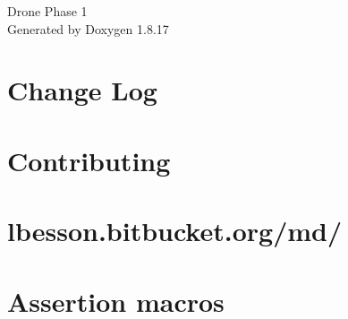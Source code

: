 \let\mypdfximage\pdfximage\def\pdfximage{\immediate\mypdfximage}\documentclass[twoside]{book}
\newcommand{\+}{\discretionary{\mbox{\scriptsize$\hookleftarrow$}}{}{}}
\newcommand{\clearemptydoublepage}{%
  \newpage{\pagestyle{empty}\cleardoublepage}%
}
\begin{document}
\hypersetup{pageanchor=false,
             bookmarksnumbered=true,
             pdfencoding=unicode
            }
\begin{titlepage}
\vspace*{7cm}
\begin{center}%
{\Large Drone Phase 1 }\\
\vspace*{1cm}
{\large Generated by Doxygen 1.8.17}\\
\end{center}
\end{titlepage}
\clearemptydoublepage
{}
\tableofcontents
\clearemptydoublepage
{}
\hypersetup{pageanchor=true}

\chapter{Change Log}
\label{md__home_kalafiorek__programowanie_obj2021_zad5_1-_mateusz-_paszkiewicz_external_doctest__c_h_a_n_g_e_l_o_g}

\chapter{Contributing}
\label{md__home_kalafiorek__programowanie_obj2021_zad5_1-_mateusz-_paszkiewicz_external_doctest__c_o_n_t_r_i_b_u_t_i_n_g}

\chapter{lbesson.\+bitbucket.\+org/md/}
\label{md__home_kalafiorek__programowanie_obj2021_zad5_1-_mateusz-_paszkiewicz_external_doctest_doc_htmb5b48830042bab69fb7d5036db39c020}

\chapter{Assertion macros}
\label{md__home_kalafiorek__programowanie_obj2021_zad5_1-_mateusz-_paszkiewicz_external_doctest_doc_markdown_assertions}

\end{document}
